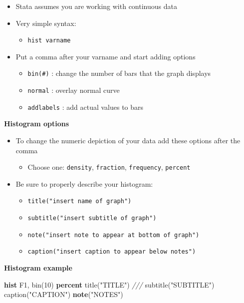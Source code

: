 \documentclass[
]{book}
\newenvironment{Shaded}{\begin{snugshade}}{\end{snugshade}}
\newcommand{\BaseNTok}[1]{\textcolor[rgb]{0.00,0.00,0.81}{#1}}
\newcommand{\CommentTok}[1]{\textcolor[rgb]{0.56,0.35,0.01}{\textit{#1}}}
\newcommand{\KeywordTok}[1]{\textcolor[rgb]{0.13,0.29,0.53}{\textbf{#1}}}
\newcommand{\NormalTok}[1]{#1}
\newcommand{\StringTok}[1]{\textcolor[rgb]{0.31,0.60,0.02}{#1}}
\providecommand{\tightlist}{%
  \setlength{\itemsep}{0pt}\setlength{\parskip}{0pt}}
\begin{document}
\begin{itemize}
\tightlist
\item
  Stata assumes you are working with continuous data
\item
  Very simple syntax:

  \begin{itemize}
  \tightlist
  \item
    \texttt{hist\ varname}
  \end{itemize}
\item
  Put a comma after your varname and start adding options

  \begin{itemize}
  \tightlist
  \item
    \texttt{bin(\#)} : change the number of bars that the graph displays
  \item
    \texttt{normal} : overlay normal curve
  \item
    \texttt{addlabels} : add actual values to bars
  \end{itemize}
\end{itemize}

\textbf{Histogram options}

\begin{itemize}
\tightlist
\item
  To change the numeric depiction of your data add these options after the comma

  \begin{itemize}
  \tightlist
  \item
    Choose one: \texttt{density}, \texttt{fraction}, \texttt{frequency}, \texttt{percent}
  \end{itemize}
\item
  Be sure to properly describe your histogram:

  \begin{itemize}
  \tightlist
  \item
    \texttt{title("insert\ name\ of\ graph")}
  \item
    \texttt{subtitle("insert\ subtitle\ of\ graph")}
  \item
    \texttt{note("insert\ note\ to\ appear\ at\ bottom\ of\ graph")}
  \item
    \texttt{caption("insert\ caption\ to\ appear\ below\ notes")}
  \end{itemize}
\end{itemize}

\textbf{Histogram example}

\begin{Shaded}
\begin{Highlighting}[]
\KeywordTok{hist}\NormalTok{ F1, }\BaseNTok{bin}\NormalTok{(10) }\KeywordTok{percent} \BaseNTok{title}\NormalTok{(}\StringTok{"TITLE"}\NormalTok{) }\CommentTok{///}
  \BaseNTok{subtitle}\NormalTok{(}\StringTok{"SUBTITLE"}\NormalTok{) }\BaseNTok{caption}\NormalTok{(}\StringTok{"CAPTION"}\NormalTok{) }\KeywordTok{note}\NormalTok{(}\StringTok{"NOTES"}\NormalTok{)}
\end{Highlighting}
\end{Shaded}
\end{document}
